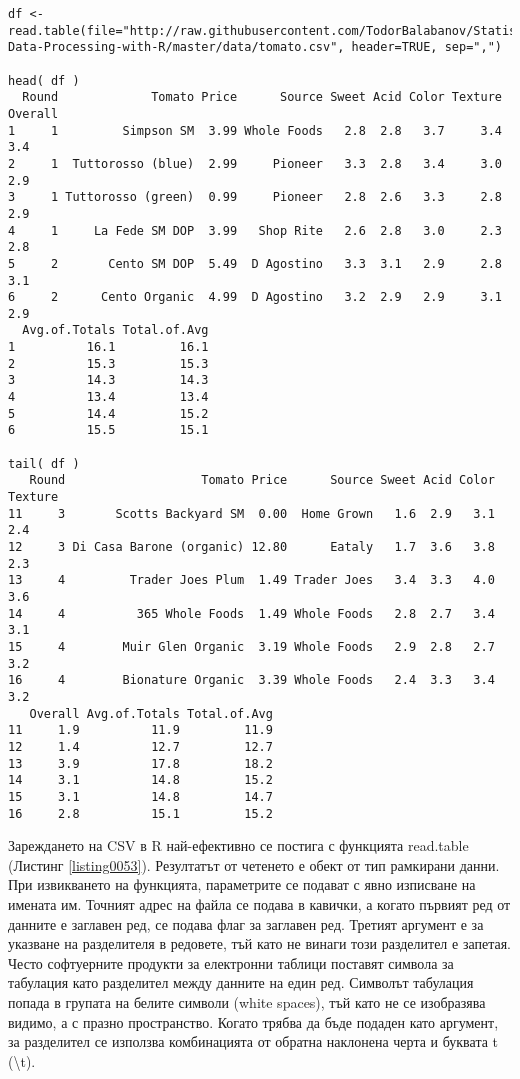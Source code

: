 \begin{lstlisting}[caption=Зареждане на данни от CSV файл, label=listing0053]
df <- read.table(file="http://raw.githubusercontent.com/TodorBalabanov/Statistical-Data-Processing-with-R/master/data/tomato.csv", header=TRUE, sep=",")

head( df )
  Round             Tomato Price      Source Sweet Acid Color Texture Overall
1     1         Simpson SM  3.99 Whole Foods   2.8  2.8   3.7     3.4     3.4
2     1  Tuttorosso (blue)  2.99     Pioneer   3.3  2.8   3.4     3.0     2.9
3     1 Tuttorosso (green)  0.99     Pioneer   2.8  2.6   3.3     2.8     2.9
4     1     La Fede SM DOP  3.99   Shop Rite   2.6  2.8   3.0     2.3     2.8
5     2       Cento SM DOP  5.49  D Agostino   3.3  3.1   2.9     2.8     3.1
6     2      Cento Organic  4.99  D Agostino   3.2  2.9   2.9     3.1     2.9
  Avg.of.Totals Total.of.Avg
1          16.1         16.1
2          15.3         15.3
3          14.3         14.3
4          13.4         13.4
5          14.4         15.2
6          15.5         15.1

tail( df )
   Round                   Tomato Price      Source Sweet Acid Color Texture
11     3       Scotts Backyard SM  0.00  Home Grown   1.6  2.9   3.1     2.4
12     3 Di Casa Barone (organic) 12.80      Eataly   1.7  3.6   3.8     2.3
13     4         Trader Joes Plum  1.49 Trader Joes   3.4  3.3   4.0     3.6
14     4          365 Whole Foods  1.49 Whole Foods   2.8  2.7   3.4     3.1
15     4        Muir Glen Organic  3.19 Whole Foods   2.9  2.8   2.7     3.2
16     4        Bionature Organic  3.39 Whole Foods   2.4  3.3   3.4     3.2
   Overall Avg.of.Totals Total.of.Avg
11     1.9          11.9         11.9
12     1.4          12.7         12.7
13     3.9          17.8         18.2
14     3.1          14.8         15.2
15     3.1          14.8         14.7
16     2.8          15.1         15.2
\end{lstlisting}

Зареждането на CSV в R най-ефективно се постига с функцията read.table (Листинг \ref{listing0053}). Резултатът от четенето е обект от тип рамкирани данни. При извикването на функцията, параметрите се подават с явно изписване на имената им. Точният адрес на файла се подава в кавички, а когато първият ред от данните е заглавен ред, се подава флаг за заглавен ред. Третият аргумент е за указване на разделителя в редовете, тъй като не винаги този разделител е запетая. Често софтуерните продукти за електронни таблици поставят символа за табулация като разделител между данните на един ред. Символът табулация попада в групата на белите символи (white spaces), тъй като не се изобразява видимо, а с празно пространство. Когато трябва да бъде подаден като аргумент, за разделител се използва комбинацията от обратна наклонена черта и буквата t (\textbackslash t).

